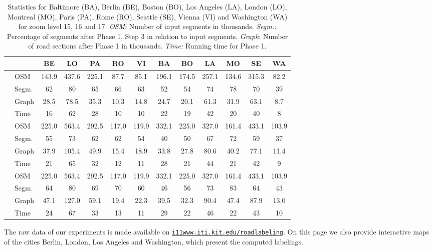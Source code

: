 \documentclass[a4paper,11pt]{article}
\begin{document}
\begin{table}[t]
  \caption{Statistics for Baltimore (BA), Berlin (BE), Boston (BO), Los Angeles (LA), London (LO), Montreal (MO),   Paris (PA), Rome (RO), Seattle (SE), Vienna (VI) and Washington (WA) for zoom level 15, 16 and 17. \emph{OSM}: Number of input segments in thousands. \emph{Segm.:} Percentage of segments after Phase 1, Step 3 in relation to input segments.
    \emph{Graph}: Number of road sections after Phase 1 in thousands. \emph{Time:} Running time for Phase 1.
  }
\label{table:instances16}
\label{table:instances15}
\label{table:instances17}
\centering
\small
\begin{tabular}{llccccccccccc}
\toprule
 && BE & LO & PA & RO & VI & BA & BO & LA & MO & SE & WA \\
\midrule
 \parbox[t]{3mm}{} &OSM & 143.9 & 437.6 & 225.1 & 87.7 & 85.1 & 196.1 & 174.5 & 257.1 & 134.6 & 315.3 & 82.2\\
&Segm.& 62 & 80 & 65 & 66 & 63 & 52 & 54 & 74 & 78 & 70 & 39\\
&Graph & 28.5 & 78.5 & 35.3 & 10.3 & 14.8 & 24.7 & 20.1 & 61.3 & 31.9 & 63.1 & 8.7\\
&Time & 16 & 62 & 28 & 10 & 10 & 22 & 19 & 42 & 20 & 40 & 8\\
\midrule
\parbox[t]{3mm}{}
&OSM & 225.0 & 563.4 & 292.5 & 117.0 & 119.9 & 332.1 & 225.0 & 327.0 & 161.4 & 433.1 & 103.9\\
&Segm. & 55 & 73 & 62 & 62 & 54 & 40 & 50 & 67 & 72 & 59 & 37\\
&Graph & 37.9 & 105.4 & 49.9 & 15.4 & 18.9 & 33.8 & 27.8 & 80.6 & 40.2 & 77.1 & 11.4\\
&Time & 21 & 65 & 32 & 12 & 11 & 28 & 21 & 44 & 21 & 42 & 9\\
\midrule
\parbox[t]{3mm}{}
&OSM & 225.0 & 563.4 & 292.5 & 117.0 & 119.9 & 332.1 & 225.0 & 327.0 & 161.4 & 433.1 & 103.9\\
&Segm. & 64 & 80 & 69 & 70 & 60 & 46 & 56 & 73 & 83 & 64 & 43\\
&Graph & 47.1 & 127.0 & 59.1 & 19.4 & 22.3 & 39.5 & 32.3 & 90.4 & 47.4 & 87.9 & 13.0\\
&Time & 24 & 67 & 33 & 13 & 11 & 29 & 22 & 46 & 22 & 43 & 10\\
\bottomrule
\end{tabular}
\end{table}

The raw data of our experiments is made available on
\href{http://i11www.iti.kit.edu/roadlabeling}{\texttt{i11www.iti.kit.edu/roadlabeling}}. On this page we also
provide interactive maps of the cities Berlin, London, Los Angeles and
Washington, which present the computed labelings. 
\end{document}
